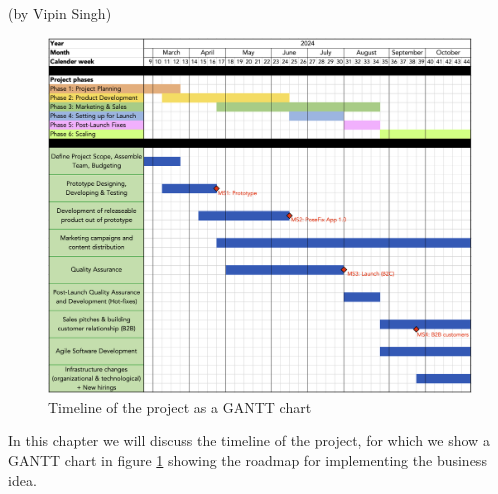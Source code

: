 (by Vipin Singh)

\begin{figure}[H]
    \centering
    \includegraphics[width=\textwidth]{figures/GANTT_timeline.png}
    \caption{Timeline of the project as a GANTT chart}
    \label{fig:timeline_gantt}
\end{figure}

\p
In this chapter we will discuss the timeline of the project, for which we show a GANTT chart in figure \ref{fig:timeline_gantt} showing the roadmap for implementing the business idea.
